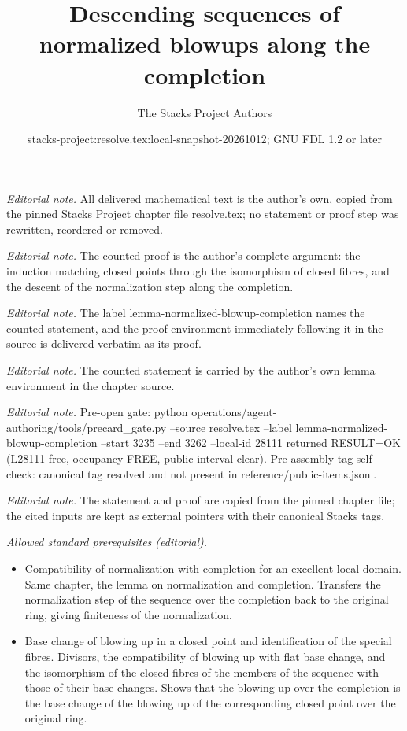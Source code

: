 \documentclass[10pt,a4paper]{amsart}
\title{Descending sequences of normalized blowups along the completion}
\author{The Stacks Project Authors}
\date{stacks-project:resolve.tex:local-snapshot-20261012; GNU FDL 1.2 or later}
\theoremstyle{plain}
\theoremstyle{definition}
\theoremstyle{remark}
\numberwithin{equation}{subsection}
\begin{document}
\maketitle
\noindent\textit{Editorial note.} All delivered mathematical text is the author's own, copied from the pinned Stacks Project chapter file resolve.tex; no statement or proof step was rewritten, reordered or removed.\par\medskip
\noindent\textit{Editorial note.} The counted proof is the author's complete argument: the induction matching closed points through the isomorphism of closed fibres, and the descent of the normalization step along the completion.\par\medskip
\noindent\textit{Editorial note.} The label lemma-normalized-blowup-completion names the counted statement, and the proof environment immediately following it in the source is delivered verbatim as its proof.\par\medskip
\noindent\textit{Editorial note.} The counted statement is carried by the author's own lemma environment in the chapter source.\par\medskip
\noindent\textit{Editorial note.} Pre-open gate: python operations/agent-authoring/tools/precard\_gate.py --source resolve.tex --label lemma-normalized-blowup-completion --start 3235 --end 3262 --local-id 28111 returned RESULT=OK (L28111 free, occupancy FREE, public interval clear). Pre-assembly tag self-check: canonical tag resolved and not present in reference/public-items.jsonl.\par\medskip
\noindent\textit{Editorial note.} The statement and proof are copied from the pinned chapter file; the cited inputs are kept as external pointers with their canonical Stacks tags.\par\medskip
\noindent\textit{Allowed standard prerequisites (editorial).}\begin{itemize}
\item Compatibility of normalization with completion for an excellent local domain. Same chapter, the lemma on normalization and completion. Transfers the normalization step of the sequence over the completion back to the original ring, giving finiteness of the normalization.
\item Base change of blowing up in a closed point and identification of the special fibres. Divisors, the compatibility of blowing up with flat base change, and the isomorphism of the closed fibres of the members of the sequence with those of their base changes. Shows that the blowing up over the completion is the base change of the blowing up of the corresponding closed point over the original ring.
\end{itemize}\medskip
\end{document}
